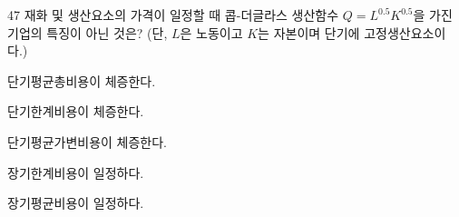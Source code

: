 \begin{question}{47}
재화 및 생산요소의 가격이 일정할 때 콥-더글라스 생산함수 $Q=L^{ 0.5 } K^{ 0.5 }$을 가진 기업의 특징이 아닌 것은? (단, $L$은 노동이고 $K$는 자본이며 단기에 고정생산요소이다.)
\begin{choices}
  \item 단기평균총비용이 체증한다.
  \item 단기한계비용이 체증한다.
  \item 단기평균가변비용이 체증한다.
  \item 장기한계비용이 일정하다.
  \item 장기평균비용이 일정하다.
\end{choices}
\end{question}
